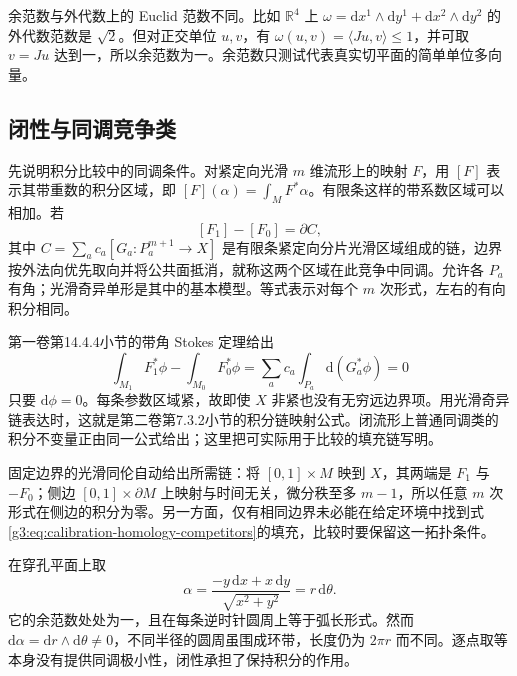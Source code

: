 余范数与外代数上的 Euclid 范数不同。比如 \(\mathbb R^4\) 上
\(\omega=\mathrm dx^1\wedge\mathrm dy^1+\mathrm dx^2\wedge\mathrm dy^2\) 的外代数范数是 \(\sqrt2\)。但对正交单位 \(u,v\)，有 \(\omega(u,v)=\langle Ju,v\rangle\le1\)，并可取 \(v=Ju\) 达到一，所以余范数为一。余范数只测试代表真实切平面的简单单位多向量。

\subsection{闭性与同调竞争类}
\label{g3:subsec:1904:02}
先说明积分比较中的同调条件。对紧定向光滑 \(m\) 维流形上的映射 \(F\)，用 \([F]\) 表示其带重数的积分区域，即 \([F](\alpha)=\int_MF^*\alpha\)。有限条这样的带系数区域可以相加。若
\begin{equation}\label{g3:eq:calibration-homology-competitors}
	[F_1]-[F_0]=\partial C,
\end{equation}
其中 \(C=\sum_a c_a[G_a:P_a^{m+1}\to X]\) 是有限条紧定向分片光滑区域组成的链，边界按外法向优先取向并将公共面抵消，就称这两个区域在此竞争中同调。允许各 \(P_a\) 有角；光滑奇异单形是其中的基本模型。等式表示对每个 \(m\) 次形式，左右的有向积分相同。

\ProseParagraphBreak

第一卷第14.4.4小节的带角 Stokes 定理给出
\begin{equation}\label{g3:eq:calibration-period-invariance}
	\int_{M_1}F_1^*\phi-\int_{M_0}F_0^*\phi
	=\sum_a c_a\int_{P_a}\mathrm d(G_a^*\phi)=0
\end{equation}
只要 \(\mathrm d\phi=0\)。每条参数区域紧，故即使 \(X\) 非紧也没有无穷远边界项。用光滑奇异链表达时，这就是第二卷第7.3.2小节的积分链映射公式。闭流形上普通同调类的积分不变量正由同一公式给出；这里把可实际用于比较的填充链写明。

\ProseParagraphBreak

固定边界的光滑同伦自动给出所需链：将 \([0,1]\times M\) 映到 \(X\)，其两端是 \(F_1\) 与 \(-F_0\)；侧边 \([0,1]\times\partial M\) 上映射与时间无关，微分秩至多 \(m-1\)，所以任意 \(m\) 次形式在侧边的积分为零。另一方面，仅有相同边界未必能在给定环境中找到式\eqref{g3:eq:calibration-homology-competitors}的填充，比较时要保留这一拓扑条件。

\begin{example}\label{g3:exm:nonclosed-unit-form-circles}
	在穿孔平面上取
	\[
		\alpha=\frac{-y\,\mathrm dx+x\,\mathrm dy}{\sqrt{x^2+y^2}}
		=r\,\mathrm d\theta.
	\]
	它的余范数处处为一，且在每条逆时针圆周上等于弧长形式。然而 \(\mathrm d\alpha=\mathrm dr\wedge\mathrm d\theta\ne0\)，不同半径的圆周虽围成环带，长度仍为 \(2\pi r\) 而不同。逐点取等本身没有提供同调极小性，闭性承担了保持积分的作用。
\end{example}

